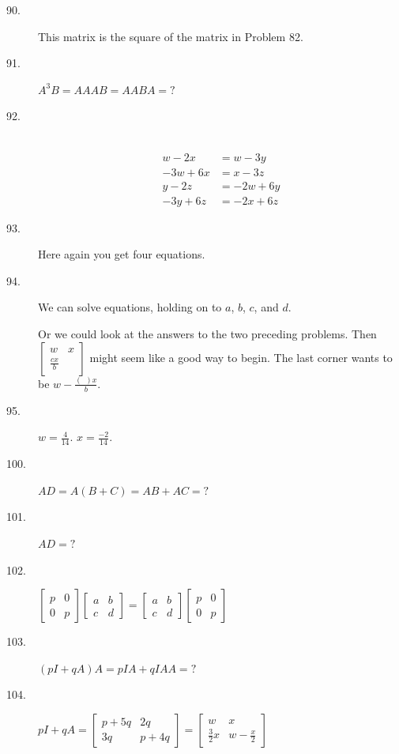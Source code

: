 \documentclass{article}
\begin{document}
\begin{description}
  \item[90.] This matrix is the square of the matrix in Problem 82.

  \item[91.] $A^3 B = AAAB = AABA = ?$

  \item[92.] $\ $
    \begin{align*}
      w - 2x & =   w - 3y \\
    -3w + 6x & =   x - 3z \\
      y - 2z & = -2w + 6y \\
    -3y + 6z & = -2x + 6z
    \end{align*}

  \item[93.] Here again you get four equations.

  \item[94.] We can solve equations, holding on to $a$, $b$, $c$, and $d$.

    Or we could look at the answers to the two preceding problems. Then $\begin{bmatrix} w & x \\ \frac{cx}{b} & \end{bmatrix}$ might seem like a good way to begin. The last corner wants to be $w - \frac{(\ \ )x}{b}$.

  \item[95.] $w = \frac{4}{14}$. $x = \frac{-2}{14}$.

  \item[100.] $AD = A(B+C) = AB + AC = ?$ 

  \item[101.] $AD = ?$ 

  \item[102.] $\begin{bmatrix} p & 0 \\ 0 & p \end{bmatrix}  \begin{bmatrix} a & b \\ c & d \end{bmatrix}  =  \begin{bmatrix} a & b \\ c & d \end{bmatrix}  \begin{bmatrix} p & 0 \\ 0 & p \end{bmatrix}$

  \item[103.] $(pI+qA)A = pIA+qIAA = ?$

  \item[104.] $pI+qA =  \begin{bmatrix} p+5q & 2q \\ 3q & p+4q \end{bmatrix}  =  \begin{bmatrix} w & x \\ \frac{3}{2}x & w-\frac{x}{2} \end{bmatrix}$

\end{description}
\end{document}

